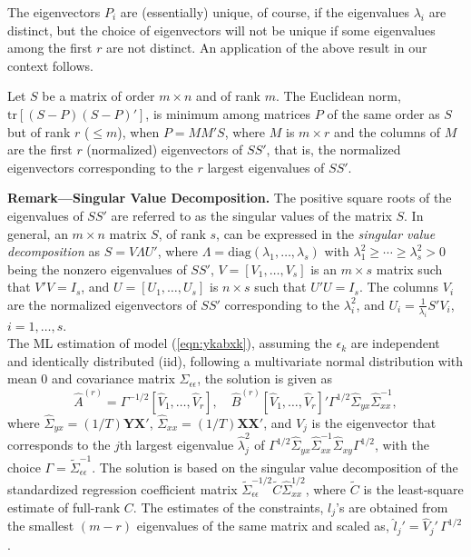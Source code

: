 The eigenvectors $P_i$ are (essentially) unique, of course, if the eigenvalues $\lambda_i$ are distinct, but the choice of eigenvectors will not be unique if some eigenvalues among the first $r$ are not distinct. An application of the above result in our context follows. 


\begin{result} \label{res:3} 
Let $S$ be a matrix of order $m \times n$ and of rank $m$. The Euclidean norm, $\text{tr}[(S-P)(S-P)']$, is minimum among matrices $P$ of the same order  as $S$ but of rank $r$ ($\leq m$), when $P=MM'S$, where $M$ is $m \times r$ and the columns of $M$ are the first $r$ (normalized) eigenvectors of $SS'$, that is, the normalized eigenvectors corresponding to the $r$ largest eigenvalues of $SS'$. 
\end{result}


\noindent \textbf{Remark---Singular Value Decomposition.} The positive square roots of the eigenvalues of $SS'$ are referred to as the singular values of the matrix $S$. In general, an $m \times n$ matrix $S$, of rank $s$, can be expressed in the \emph{singular value decomposition} as $S=V \Lambda U'$, where $\Lambda=\text{diag}(\lambda_1,\ldots,\lambda_s)$ with $\lambda_1^2 \geq \cdots \geq \lambda_s^2 >0$ being the nonzero eigenvalues of $SS'$, $V=[V_1,\ldots,V_s]$ is an $m \times s$ matrix such that $V'V=I_s$, and $U=[U_1,\ldots,U_s]$ is $n \times s$ such that $U'U=I_s$. The columns $V_i$ are the normalized eigenvectors of $SS'$ corresponding to the $\lambda_i^2$, and $U_i=\frac{1}{\lambda_i}S'V_i$, $i=1,\ldots,s$. \\


The ML estimation of model (\ref{eqn:ykabxk}), assuming the $\epsilon_k$ are independent and identically distributed (iid), following a multivariate normal distribution with mean 0 and covariance matrix $\Sigma_{\epsilon\epsilon}$, the solution is given as 
	\begin{equation}\label{eqn:covarmatrixsol}
	\hat{A}^{(r)}=\Gamma^{-1/2}[\hat{V}_1,\ldots,\hat{V}_r], \quad \hat{B}^{(r)}[\hat{V}_1,\ldots,\hat{V}_r]' \Gamma^{1/2} \hat{\Sigma}_{yx} \hat{\Sigma}_{xx}^{-1},
	\end{equation}
where $\hat{\Sigma}_{yx}=(1/T)\mathbf{Y}\mathbf{X}'$, $\hat{\Sigma}_{xx}=(1/T)\mathbf{X}\mathbf{X}'$, and $\hat{V}_j$ is the eigenvector that corresponds to the $j$th largest eigenvalue $\hat{\lambda}_j^2$ of $\Gamma^{1/2}\hat{\Sigma}_{yx} \hat{\Sigma}_{xx}^{-1} \hat{\Sigma}_{xy}\Gamma^{1/2}$, with the choice $\Gamma=\tilde{\Sigma}_{\epsilon\epsilon}^{-1}$. The solution is based on the singular value decomposition of the standardized regression coefficient matrix $\tilde{\Sigma}_{\epsilon\epsilon}^{-1/2} \tilde{C} \hat{\Sigma}_{xx}^{1/2}$, where $\tilde{C}$ is the least-square estimate of full-rank $C$. The estimates of the constraints, $l_j$'s are obtained from the smallest $(m-r)$ eigenvalues of the same matrix and scaled as, $\hat{l}_j'=\hat{V}_j' \, \Gamma^{1/2}$. 


